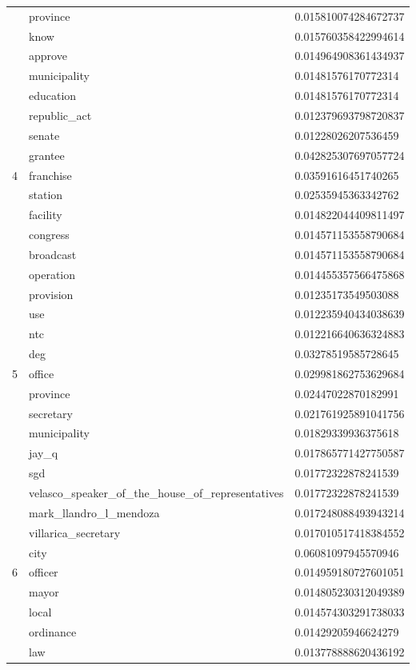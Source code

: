 \documentclass[conference]{IEEEtran}
\begin{document}
\begin{center}
\begin{longtable}{|l|l|l|}
& province & 0.015810074284672737 \\
& know & 0.015760358422994614 \\
& approve & 0.014964908361434937 \\
& municipality & 0.01481576170772314 \\
& education & 0.01481576170772314 \\
& republic\_act & 0.012379693798720837 \\
& senate & 0.01228026207536459 \\
\hline
\multirow{3}{4em}{4} & grantee & 0.042825307697057724 \\
& franchise & 0.03591616451740265 \\
& station & 0.02535945363342762 \\
& facility & 0.014822044409811497 \\
& congress & 0.014571153558790684 \\
& broadcast & 0.014571153558790684 \\
& operation & 0.014455357566475868 \\
& provision & 0.01235173549503088 \\
& use & 0.012235940434038639 \\
& ntc & 0.012216640636324883 \\
\hline
\multirow{3}{4em}{5} & deg & 0.03278519585728645 \\
& office & 0.029981862753629684 \\
& province & 0.02447022870182991 \\
& secretary & 0.021761925891041756 \\
& municipality & 0.01829339936375618 \\
& jay\_q & 0.017865771427750587 \\
& sgd & 0.01772322878241539 \\
& velasco\_speaker\_of\_the\_house\_of\_representatives & 0.01772322878241539 \\
& mark\_llandro\_l\_mendoza & 0.017248088493943214 \\
& villarica\_secretary & 0.017010517418384552 \\
\hline
\multirow{3}{4em}{6} & city & 0.06081097945570946 \\
& officer & 0.014959180727601051 \\
& mayor & 0.014805230312049389 \\
& local & 0.014574303291738033 \\
& ordinance & 0.01429205946624279 \\
& law & 0.013778888620436192 \\

\end{longtable}
\end{center}
\end{document}
